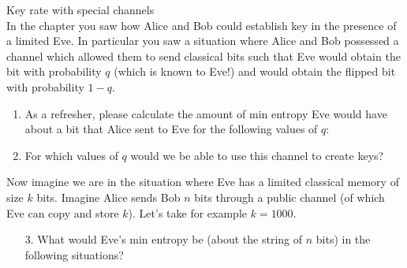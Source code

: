 \begin{exercises}
\item {Key rate with special channels}\\
In the chapter you saw how Alice and Bob could establish key in the presence of a limited Eve. In particular you saw a situation where Alice and Bob possessed a channel which allowed them to send classical bits such that Eve would obtain the bit with probability \(q\) (which is known to Eve!) and would obtain the flipped bit with probability \(1-q\).
\begin{enumerate}
\item As a refresher, please calculate the amount of min entropy Eve would have about a bit that Alice sent to Eve for the following values of \(q\):
\item For which values of \(q\) would we be able to use this channel to create keys?
\end{enumerate}
Now imagine we are in the situation where Eve has a limited classical memory of size \(k\) bits. Imagine Alice sends Bob \(n\) bits through a public channel (of which Eve can copy and store \(k\)). Let's take for example \(k=1000\).
\begin{enumerate}
\item[3.] What would Eve's min entropy be (about the string of \(n\) bits) in the following situations?
\end{enumerate}


\end{exercises}
